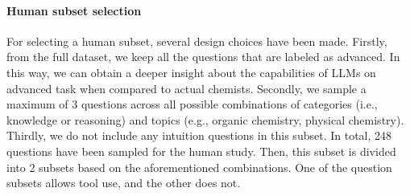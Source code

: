 \paragraph{Human subset selection}

For selecting a human subset, several design choices have been made. Firstly, from the full dataset, we keep all the questions that are labeled as advanced. In this way, we can obtain a deeper insight about the capabilities of LLMs on advanced task
when compared to actual chemists. Secondly, we sample a maximum of 3 questions across all possible combinations of categories (i.e., knowledge or reasoning) and topics (e.g., organic chemistry, physical chemistry). Thirdly, we do not include any intuition questions
in this subset. In total, 248 questions have been sampled for the human study. Then, this subset is divided into 2 subsets based on the aforementioned combinations. One of the question subsets allows tool use, and the other does not.

